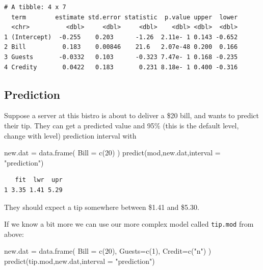 \documentclass[
  letterpaper,
  DIV=11,
  numbers=noendperiod]{scrreprt}
\newenvironment{Shaded}{\begin{snugshade}}{\end{snugshade}}
\newcommand{\AttributeTok}[1]{\textcolor[rgb]{0.49,0.56,0.16}{#1}}
\newcommand{\DecValTok}[1]{\textcolor[rgb]{0.25,0.63,0.44}{#1}}
\newcommand{\FunctionTok}[1]{\textcolor[rgb]{0.02,0.16,0.49}{#1}}
\newcommand{\NormalTok}[1]{\textcolor[rgb]{0.00,0.44,0.13}{#1}}
\newcommand{\OtherTok}[1]{\textcolor[rgb]{0.00,0.44,0.13}{#1}}
\newcommand{\StringTok}[1]{\textcolor[rgb]{0.25,0.44,0.63}{#1}}
\begin{document}
\begin{verbatim}
# A tibble: 4 x 7
  term        estimate std.error statistic  p.value upper  lower
  <chr>          <dbl>     <dbl>     <dbl>    <dbl> <dbl>  <dbl>
1 (Intercept)  -0.255    0.203      -1.26  2.11e- 1 0.143 -0.652
2 Bill          0.183    0.00846    21.6   2.07e-48 0.200  0.166
3 Guests       -0.0332   0.103      -0.323 7.47e- 1 0.168 -0.235
4 Credity       0.0422   0.183       0.231 8.18e- 1 0.400 -0.316
\end{verbatim}

\hypertarget{prediction}{%
\subsection{Prediction}\label{prediction}}

Suppose a server at this bistro is about to deliver a \$20 bill, and
wants to predict their tip. They can get a predicted value and 95\%
(this is the default level, change with level) prediction interval with

\begin{Shaded}
\begin{Highlighting}[]
\NormalTok{new.dat }\OtherTok{=} \FunctionTok{data.frame}\NormalTok{( }\AttributeTok{Bill =} \FunctionTok{c}\NormalTok{(}\DecValTok{20}\NormalTok{) )}
\FunctionTok{predict}\NormalTok{(mod,new.dat,}\AttributeTok{interval =} \StringTok{"prediction"}\NormalTok{)}
\end{Highlighting}
\end{Shaded}

\begin{verbatim}
   fit  lwr  upr
1 3.35 1.41 5.29
\end{verbatim}

They should expect a tip somewhere between \$1.41 and \$5.30.

If we know a bit more we can use our more complex model called
\texttt{tip.mod} from above:

\begin{Shaded}
\begin{Highlighting}[]
\NormalTok{new.dat }\OtherTok{=} \FunctionTok{data.frame}\NormalTok{( }\AttributeTok{Bill =} \FunctionTok{c}\NormalTok{(}\DecValTok{20}\NormalTok{), }\AttributeTok{Guests=}\FunctionTok{c}\NormalTok{(}\DecValTok{1}\NormalTok{), }\AttributeTok{Credit=}\FunctionTok{c}\NormalTok{(}\StringTok{"n"}\NormalTok{) )}
\FunctionTok{predict}\NormalTok{(tip.mod,new.dat,}\AttributeTok{interval =} \StringTok{"prediction"}\NormalTok{)}
\end{Highlighting}
\end{Shaded}
\end{document}
